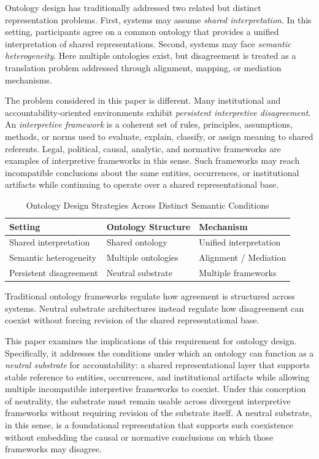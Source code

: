 Ontology design has traditionally addressed two related but distinct
representation problems.
First, systems may assume \emph{shared interpretation}.
In this setting, participants agree on a common ontology that
provides a unified interpretation of shared representations.
Second, systems may face \emph{semantic heterogeneity}.
Here multiple ontologies exist, but disagreement is treated as
a translation problem addressed through alignment,
mapping, or mediation mechanisms.

The problem considered in this paper is different.
Many institutional and accountability-oriented environments exhibit
\emph{persistent interpretive disagreement}.
An \emph{interpretive framework} is a coherent set of rules,
principles, assumptions, methods, or norms used to evaluate,
explain, classify, or assign meaning to shared referents.
Legal, political, causal, analytic, and normative frameworks
are examples of interpretive frameworks in this sense.
Such frameworks may reach incompatible conclusions about the same
entities, occurrences, or institutional artifacts while continuing
to operate over a shared representational base.

\begin{table}[h!]
\centering
\small
\caption{Ontology Design Strategies Across Distinct Semantic Conditions}
\label{tab:ontology_strategies}
\vspace{0.5em}
\begin{tabular}{lll}
\toprule
\textbf{Setting} & \textbf{Ontology Structure} & \textbf{Mechanism} \\
\midrule
Shared interpretation  & Shared ontology    & Unified interpretation \\
Semantic heterogeneity & Multiple ontologies & Alignment / Mediation \\
Persistent disagreement & Neutral substrate  & Multiple frameworks \\
\bottomrule
\end{tabular}
\end{table}

Traditional ontology frameworks regulate
how agreement is structured across systems.
Neutral substrate architectures instead regulate
how disagreement can coexist without forcing
revision of the shared representational base.

This paper examines the implications
of this requirement for ontology design.
Specifically, it addresses the conditions under which an ontology
can function as a \emph{neutral substrate} for accountability:
a shared representational layer that supports stable reference to
entities, occurrences, and institutional artifacts while allowing
multiple incompatible interpretive frameworks to coexist.
Under this conception of neutrality, the substrate must remain usable
across divergent interpretive frameworks without requiring revision
of the substrate itself.
A neutral substrate, in this sense, is a foundational representation
that supports such coexistence without embedding the causal or
normative conclusions on which those frameworks may disagree.

